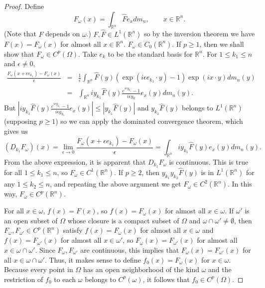 \documentclass{article}
\theoremstyle{definition}
\begin{document}
\begin{proof}
Define 
\[
F_\omega(x) = \int_{\mathbb{R}^n} \widehat{F} e_x dm_n, \qquad x \in \mathbb{R}^n.
\]
(Note that $F$ depends on $\omega$.)
$F,\widehat{F} \in L^1(\mathbb{R}^n)$ so by the inversion theorem we have $F(x)=F_\omega(x)$ for almost all $x \in \mathbb{R}^n$. 
$F_\omega \in C_0(\mathbb{R}^n)$. If $p \geq 1$, then we shall show that $F_\omega \in C^p(\Omega)$.
Take $e_k$ to be the standard basis for $\mathbb{R}^n$. For $1 \leq k_1 \leq n$ and $\epsilon \neq 0$,
\begin{eqnarray*}
\frac{F_\omega(x+\epsilon e_{k_1})-F_\omega(x)}{\epsilon}&=&\frac{1}{\epsilon} \int_{\mathbb{R}^n} \widehat{F}(y) \left(\exp(i \epsilon e_{k_1} \cdot y)-1\right)
\exp(ix\cdot y) dm_n(y)\\
&=&\int_{\mathbb{R}^n} iy_{k_1} \widehat{F}(y) \frac{e^{i\epsilon y_{k_1}}-1}{i\epsilon y_k} e_x(y) dm_n(y).
\end{eqnarray*}
But $\left| iy_{k_1} \widehat{F}(y) \frac{e^{i\epsilon y_{k_1}}-1}{i\epsilon y_{k_1}} e_x(y)\right| \leq |y_{k_1} \widehat{F}(y)|$ and $y_{k_1} \widehat{F}(y)$ belongs to $L^1(\mathbb{R}^n)$ (supposing
 $p \geq 1$)
so we can apply the dominated convergence theorem, which gives us
\[
(D_{k_1} F_\omega)(x)  = \lim_{\epsilon \to 0} \frac{F_\omega(x+\epsilon e_{k_1})-F_\omega(x)}{\epsilon} = \int_{\mathbb{R}^n} iy_{k_1} \widehat{F}(y) e_x(y) dm_n(y).
\]
From the above expression, it is apparent that  $D_{k_1}F_\omega$ is continuous. This is true for all $1 \leq k_1 \leq n$, so 
$F_\omega \in C^1(\mathbb{R}^n)$. If $p \geq 2$, then $y_{k_1}y_{k_2} \widehat{F}(y)$ is in $L^1(\mathbb{R}^n)$ for any $1 \leq k_2 \leq n$, and repeating the above
argument we get $F_\omega \in C^2(\mathbb{R}^n)$. In this way, $F_\omega \in C^p(\mathbb{R}^n)$. 

For all $x \in \omega$, $f(x)=F(x)$, so $f(x)=F_\omega(x)$ for almost all $x \in \omega$.
If $\omega'$ is an open subset of $\Omega$ whose closure is a compact
subset of $\Omega$ and $\omega \cap \omega' \neq \emptyset$, then $F_\omega,F_{\omega'} \in C^p(\mathbb{R}^n)$ satisfy
$f(x)=F_\omega(x)$ for almost all $x \in \omega$ and $f(x) = F_{\omega'}(x)$ for almost
all $x \in \omega'$, so $F_\omega(x)=F_{\omega'}(x)$ for almost all $x \in \omega \cap
\omega'$. Since $F_\omega,F_{\omega'}$ are continuous, this implies that $F_\omega(x)=
F_{\omega'}(x)$ for all $x \in \omega \cap \omega'$. Thus, it makes sense to define $f_0(x)=F_\omega(x)$ for $x \in \omega$. 
Because every point in $\Omega$ has an open neighborhood of the kind $\omega$ and the restriction of $f_0$ to each $\omega$ belongs to
$C^p(\omega)$, it follows that $f_0 \in C^p(\Omega)$. 
\end{proof}
\end{document}
